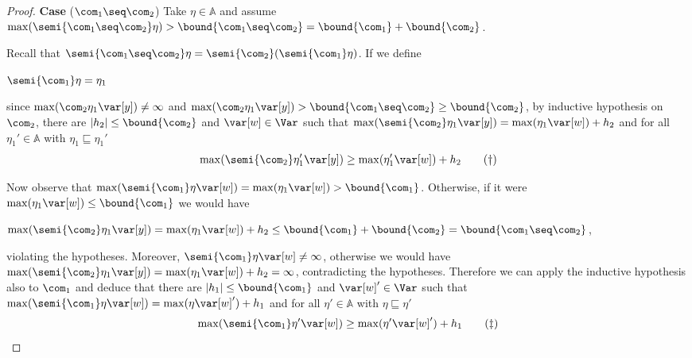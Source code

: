 \begin{proof}
  \medskip
  
  \noindent
  \textbf{Case} (\(\com_1 \seq \com_2\))
  Take \(\eta \in \mathbb{A}\) and assume
  \(\max(\semi{\com_1 \seq \com_2}\eta) > \bound{\com_1 \seq \com_2} =
  \bound{\com_1} + \bound{\com_2}\).
  
  Recall that
  \(\semi{\com_1 \seq \com_2} \eta = \semi{\com_2}(\semi{\com_1}\eta)\).
  If we define
  \begin{center}
    \(\semi{\com_1} \eta = \eta_1\)
  \end{center}
  since \(\max(\com_2 \eta_1 \var[y]) \neq \infty\) and 
  \(\max(\com_2 \eta_1 \var[y]) > \bound{\com_1 \seq \com_2} \geq
  \bound{\com_2}\), by inductive hypothesis on \(\com_2\), there are
  \(|h_2| \leq \bound{\com_2}\) and \(\var[w] \in \Var\) such that
  \(\max(\semi{\com_2} \eta_1 \var[y]) = \max(\eta_1 \var[w]) + h_2\) and
  for all \(\eta_1' \in \mathbb{A}\) with \(\eta_1 \sqsubseteq \eta_1'\)
  \begin{equation}
    \label{eq:seq2}
    \max(\semi{\com_2} \eta_1' \var[y]) \geq \max(\eta_1' \var[w]) + h_2
    \tag{\dag}
  \end{equation}
  
  Now observe that
  \(\max(\semi{\com_1}\eta \var[w]) = \max(\eta_1 \var[w]) >
  \bound{\com_1}\). Otherwise, if it were \(\max(\eta_1 \var[w]) \leq
  \bound{\com_1}\) we would have
  \begin{center}
    \(\max(\semi{\com_2}\eta_1 \var[y]) = \max(\eta_1 \var[w]) + h_2 \leq
    \bound{\com_1} + \bound{\com_2} = \bound{\com_1 \seq \com_2}\),
  \end{center}
  violating the hypotheses. Moreover,
  \(\semi{\com_1}\eta \var[w] \neq \infty\), otherwise we would have
  \(\max(\semi{\com_2} \eta_1 \var[y]) = \max(\eta_1 \var[w]) + h_2 =
  \infty\), contradicting the hypotheses.  Therefore we can apply the
  inductive hypothesis also to \(\com_1\) and deduce that there are
  \(|h_1| \leq \bound{\com_1}\) and \(\var[w]' \in \Var\) such that
  \(\max(\semi{\com_1} \eta \var[w]) = \max(\eta \var[w]') + h_1\) and
  for all \(\eta' \in \mathbb{A}\) with \(\eta \sqsubseteq \eta'\)
  \begin{equation}
    \label{eq:seq1}
    \max(\semi{\com_1} \eta' \var[w]) \geq \max(\eta' \var[w]') + h_1
    \tag{\ddag}
  \end{equation}


\end{proof}
